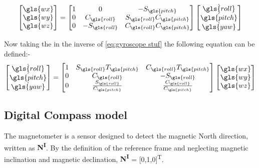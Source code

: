 \begin{equation}
	\begin{bmatrix}																
		\gls{wx} \\
		\gls{wy} \\
		\gls{wz}
	\end{bmatrix} =
	\begin{bmatrix}																
		1 & 0               & -S_{\gls{pitch}}              \\
		0 & C_{\gls{roll}}  & S_{\gls{roll}}C_{\gls{pitch}} \\
		0 & -S_{\gls{roll}} & C_{\gls{roll}}C_{\gls{pitch}}\end{bmatrix}
	\begin{bmatrix}																
		\dot{\gls{roll} } \\
		\dot{\gls{pitch}} \\
		\dot{\gls{yaw}}\end{bmatrix}
	\label{eq:gyroscope stuf}
\end{equation}

Now taking the in the inverse of \eqref{eq:gyroscope stuf} the following equation can be defined:-
\begin{equation}
	\begin{bmatrix}																
		\dot{\gls{roll} } \\
		\dot{\gls{pitch}} \\
		\dot{\gls{yaw}}
	\end{bmatrix}
	=
	\begin{bmatrix}																
		1 & S_{\gls{roll}}T_{\gls{pitch}}           & C_{\gls{roll}}T_{\gls{pitch}}          \\
		0 & C_{\gls{roll}}                          & -S_{\gls{roll}}                        \\
		0 & \frac{S_{\gls{roll}} }{C_{\gls{pitch}}} & \frac{C_{\gls{roll}}}{C_{\gls{pitch}}}
	\end{bmatrix}
	\begin{bmatrix}																
		\gls{wx} \\
		\gls{wy} \\
		\gls{wz}
	\end{bmatrix}
	\label{Eq: angleur velocity from gyro1}
\end{equation}

\subsection{Digital Compass model}

The magnetometer is a sensor designed to detect the magnetic North direction, written as {\bf  N\textsuperscript I}. By the definition of the reference frame and neglecting  magnetic inclination and magnetic declination, {\bf  N\textsuperscript I} = [0,1,0]\textsuperscript T.

